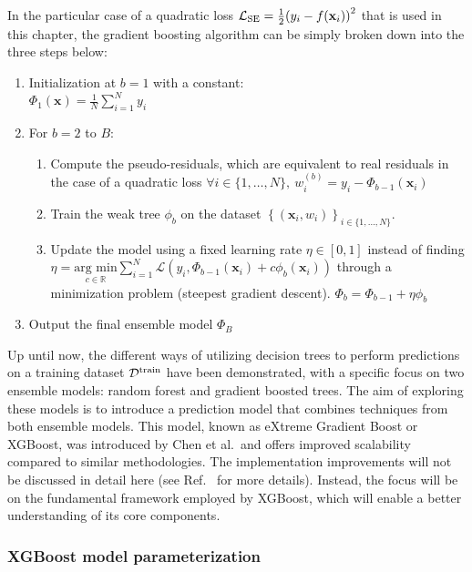 \documentclass[main]{subfiles}
\begin{document}
In the particular case of a quadratic loss $\mathcal{L}_{\text{SE}} =\tfrac{1}{2} {\left(y_i - f(\mathbf{x}_i)\right)}^2$ that is used in this chapter, the gradient boosting algorithm can be simply broken down into the three steps below:\autocite{Friedman2002}
\begin{enumerate}
  \item Initialization at $b=1$ with a constant: \\
    \quad $\Phi_1(\mathbf{x}) = \frac{1}{N}\sum_{i=1}^{N}y_i$
  \item For $b = 2$ to $B$:
    \begin{enumerate}
      \item Compute the pseudo-residuals, which are equivalent to real residuals in the case of a quadratic loss
        \quad $\forall i\in \{1,\ldots,N\},\ w_i^{(b)} = y_i - \Phi_{b-1}(\mathbf{x}_i)$
      \item Train the weak tree $\phi_b$ on the dataset ${\left\{ (\mathbf{x}_i, w_i) \right\}}_{i\in \{1,\ldots,N\}}$.
      \item Update the model using a fixed learning rate $\eta\in [0,1]$ instead of finding $\eta =\underset{c\in \mathbb{R}}{\text{arg min}} \sum_{i=1}^{N}\mathcal{L}\left(y_i,\Phi_{b-1}(\mathbf{x}_i) + c \phi_b(\mathbf{x}_i)\right)$ through a minimization problem (steepest gradient descent).
        \quad $\Phi_b = \Phi_{b-1} + \eta \phi_{b}$
    \end{enumerate}
  \item Output the final ensemble model $\Phi_B$
\end{enumerate}

Up until now, the different ways of utilizing decision trees to perform predictions on a training dataset $\mathcal{D}^{\text{train}}$ have been demonstrated, with a specific focus on two ensemble models: random forest and gradient boosted trees. The aim of exploring these models is to introduce a prediction model that combines techniques from both ensemble models. This model, known as eXtreme Gradient Boost or XGBoost, was introduced by Chen et al.\ and offers improved scalability compared to similar methodologies. The implementation improvements will not be discussed in detail here (see Ref.~\cite{chen2016xgboost} for more details). Instead, the focus will be on the fundamental framework employed by XGBoost, which will enable a better understanding of its core components.

\subsubsection{XGBoost model parameterization}
\end{document}
